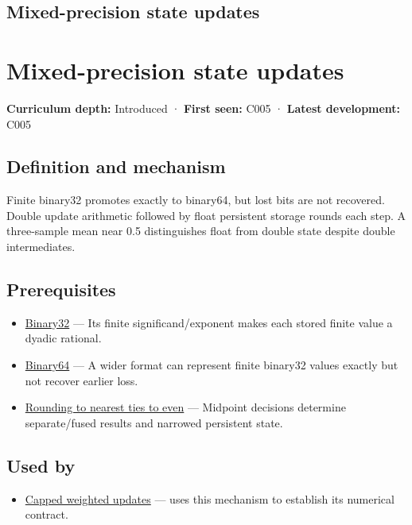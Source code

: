 \hypertarget{appendix-260182e617b7}{}
\section*{Mixed-precision state updates}
\chapter{Mixed-precision state updates}\label{appendix-260182e617b7-mixed-precision-state-updates}

\textbf{Curriculum depth:} Introduced · \textbf{First seen:} C005 · \textbf{Latest development:} C005

\section{Definition and mechanism}\label{appendix-260182e617b7-definition-and-mechanism}

Finite binary32 promotes exactly to binary64, but lost bits are not recovered. Double update arithmetic followed by float persistent storage rounds each step. A three-sample mean near 0.5 distinguishes float from double state despite double intermediates.

\section{Prerequisites}\label{appendix-260182e617b7-prerequisites}

\begin{itemize}
\tightlist
\item
  \hyperref[appendix-5057f9ad327f]{Binary32} --- Its finite significand/exponent makes each stored finite value a dyadic rational.
\item
  \hyperref[appendix-5078dfab64e6]{Binary64} --- A wider format can represent finite binary32 values exactly but not recover earlier loss.
\item
  \hyperref[appendix-614afe1de592]{Rounding to nearest ties to even} --- Midpoint decisions determine separate/fused results and narrowed persistent state.
\end{itemize}

\section{Used by}\label{appendix-260182e617b7-used-by}

\begin{itemize}
\tightlist
\item
  \hyperref[appendix-1e45d0613db3]{Capped weighted updates} --- uses this mechanism to establish its numerical contract.
\end{itemize}

